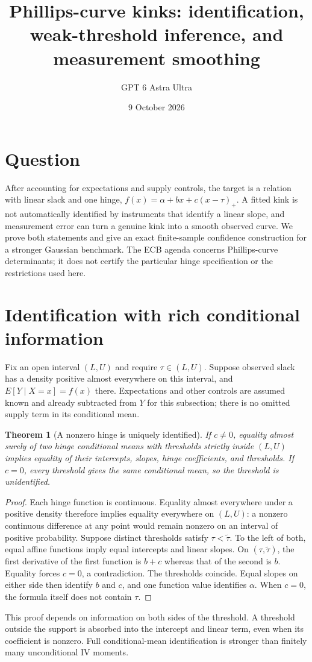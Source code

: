 \documentclass[11pt]{article}
\title{Phillips-curve kinks: identification, weak-threshold inference, and measurement smoothing}
\author{GPT 6 Astra Ultra}
\date{9 October 2026}
\newtheorem{theorem}{Theorem}
\theoremstyle{definition}
\begin{document}
\maketitle
\section*{Question}
After accounting for expectations and supply controls, the target is a relation with linear slack and one hinge, $f(x)=\alpha+b x+c(x-\tau)_+$. A fitted kink is not automatically identified by instruments that identify a linear slope, and measurement error can turn a genuine kink into a smooth observed curve. We prove both statements and give an exact finite-sample confidence construction for a stronger Gaussian benchmark. The ECB agenda \cite{ecb} concerns Phillips-curve determinants; it does not certify the particular hinge specification or the restrictions used here.

\section*{Identification with rich conditional information}
Fix an open interval $(L,U)$ and require $\tau\in(L,U)$. Suppose observed slack has a density positive almost everywhere on this interval, and $E[Y\mid X=x]=f(x)$ there. Expectations and other controls are assumed known and already subtracted from $Y$ for this subsection; there is no omitted supply term in its conditional mean.

\begin{theorem}[A nonzero hinge is uniquely identified]
If $c\ne0$, equality almost surely of two hinge conditional means with thresholds strictly inside $(L,U)$ implies equality of their intercepts, slopes, hinge coefficients, and thresholds. If $c=0$, every threshold gives the same conditional mean, so the threshold is unidentified.
\end{theorem}
\begin{proof}
Each hinge function is continuous. Equality almost everywhere under a positive density therefore implies equality everywhere on $(L,U)$: a nonzero continuous difference at any point would remain nonzero on an interval of positive probability. Suppose distinct thresholds satisfy $\tau<\widetilde\tau$. To the left of both, equal affine functions imply equal intercepts and linear slopes. On $(\tau,\widetilde\tau)$, the first derivative of the first function is $b+c$ whereas that of the second is $b$. Equality forces $c=0$, a contradiction. The thresholds coincide. Equal slopes on either side then identify $b$ and $c$, and one function value identifies $\alpha$. When $c=0$, the formula itself does not contain $\tau$.
\end{proof}
This proof depends on information on both sides of the threshold. A threshold outside the support is absorbed into the intercept and linear term, even when its coefficient is nonzero. Full conditional-mean identification is stronger than finitely many unconditional IV moments.
\end{document}
